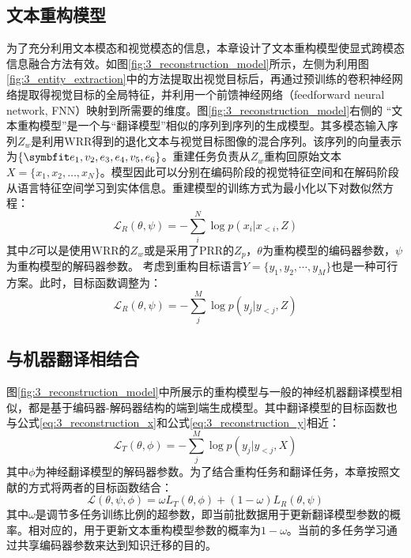 \subsection{文本重构模型}
\label{sec:3_sentence_reconstruction}

为了充分利用文本模态和视觉模态的信息，本章设计了文本重构模型使显式跨模态信息融合方法有效。如图\ref{fig:3_reconstruction_model}所示，左侧为利用图\ref{fig:3_entity_extraction}中的方法提取出视觉目标后，再通过预训练的卷积神经网络提取得视觉目标的全局特征，并利用一个前馈神经网络（feedforward neural network, FNN）映射到所需要的维度。图\ref{fig:3_reconstruction_model}右侧的 “文本重构模型”是一个与“翻译模型”相似的序列到序列的生成模型。其多模态输入序列$Z_{w}$是利用WRR得到的退化文本与视觉目标图像的混合序列。该序列的向量表示为$\{\Vector{e_1,v_2,e_3,e_4,v_5,e_6}\}$。重建任务负责从$Z_{w}$重构回原始文本$X=\{x_1,x_2,…,x_N\}$。模型因此可以分别在编码阶段的视觉特征空间和在解码阶段从语言特征空间学习到实体信息。重建模型的训练方式为最小化以下对数似然方程：
\begin{equation}
    \mathcal{L}_R(\theta, \psi)=-\sum_i^N \log p(x_i|x_{<i},Z)
    \label{eq:3_reconstruction_x}
\end{equation}
其中$Z$可以是使用WRR的$Z_{w}$或是采用了PRR的$Z_{p}$，$\theta$为重构模型的编码器参数，$\psi$为重构模型的解码器参数。
考虑到重构目标语言$Y=\{y_1,y_2,\cdots,y_M\}$也是一种可行方案。此时，目标函数调整为：
\begin{equation}
    \mathcal{L}_R(\theta, \psi)=-\sum_j^M \log p(y_j|y_{<j},Z)
    \label{eq:3_reconstruction_y}
\end{equation}

\subsection{与机器翻译相结合}
\label{sec:3_multitask}
图\ref{fig:3_reconstruction_model}中所展示的重构模型与一般的神经机器翻译模型相似，都是基于编码器-解码器结构的端到端生成模型。其中翻译模型的目标函数也与公式\ref{eq:3_reconstruction_x}和公式\ref{eq:3_reconstruction_y}相近：
\begin{equation}
    \mathcal{L}_T(\theta, \phi)=-\sum_j^M \log p(y_j|y_{<j},X)
    \label{eq:3_translation}
\end{equation}
其中$\phi$为神经翻译模型的解码器参数。为了结合重构任务和翻译任务，本章按照文献\cite{37_elliott-kadar-2017-imagination}的方式将两者的目标函数结合：
\begin{equation}
    \mathcal{L}(\theta, \psi, \phi)=\omega L_T(\theta, \phi) + (1-\omega)L_R(\theta, \psi)
    \label{eq:3_combine_sr}
\end{equation}
其中$\omega$是调节多任务训练比例的超参数，即当前批数据用于更新翻译模型参数的概率。相对应的，用于更新文本重构模型参数的概率为$1-\omega$。当前的多任务学习通过共享编码器参数来达到知识迁移的目的。

